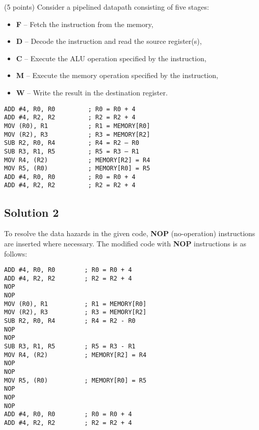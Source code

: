 \documentclass{article}
\begin{document}
(5 points) Consider a pipelined datapath consisting of five stages:
\begin{itemize}
    \item \textbf{F} -- Fetch the instruction from the memory,
    \item \textbf{D} -- Decode the instruction and read the source register(s),
    \item \textbf{C} -- Execute the ALU operation specified by the instruction,
    \item \textbf{M} -- Execute the memory operation specified by the instruction,
    \item \textbf{W} -- Write the result in the destination register.
\end{itemize}


\begin{lstlisting}
ADD #4, R0, R0         ; R0 = R0 + 4
ADD #4, R2, R2         ; R2 = R2 + 4
MOV (R0), R1           ; R1 = MEMORY[R0]
MOV (R2), R3           ; R3 = MEMORY[R2]
SUB R2, R0, R4         ; R4 = R2 – R0
SUB R3, R1, R5         ; R5 = R3 – R1
MOV R4, (R2)           ; MEMORY[R2] = R4
MOV R5, (R0)           ; MEMORY[R0] = R5
ADD #4, R0, R0         ; R0 = R0 + 4
ADD #4, R2, R2         ; R2 = R2 + 4
\end{lstlisting}

\subsection*{Solution 2}
To resolve the data hazards in the given code, \textbf{NOP} (no-operation) instructions are inserted where necessary. The modified code with \textbf{NOP} instructions is as follows:

\begin{lstlisting}
ADD #4, R0, R0        ; R0 = R0 + 4
ADD #4, R2, R2        ; R2 = R2 + 4
NOP
NOP
MOV (R0), R1          ; R1 = MEMORY[R0]
MOV (R2), R3          ; R3 = MEMORY[R2]
SUB R2, R0, R4        ; R4 = R2 - R0
NOP
NOP
SUB R3, R1, R5        ; R5 = R3 - R1
MOV R4, (R2)          ; MEMORY[R2] = R4
NOP
NOP
MOV R5, (R0)      	  ; MEMORY[R0] = R5
NOP
NOP
NOP
ADD #4, R0, R0        ; R0 = R0 + 4
ADD #4, R2, R2        ; R2 = R2 + 4
\end{lstlisting}
\end{document}
